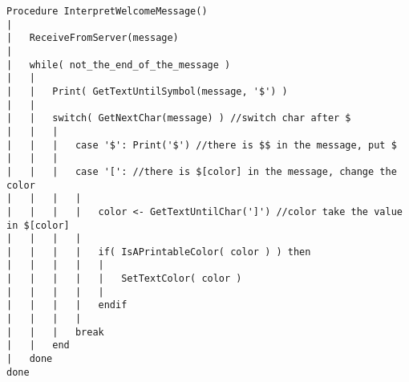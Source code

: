 \begin{lstlisting}
Procedure InterpretWelcomeMessage()
|	
|	ReceiveFromServer(message)
|	
|	while( not_the_end_of_the_message )
|	|	
|	|	Print( GetTextUntilSymbol(message, '$') )
|	|	
|	|	switch( GetNextChar(message) ) //switch char after $
|	|	|	
|	|	|	case '$': Print('$') //there is $$ in the message, put $
|	|	|	
|	|	|	case '[': //there is $[color] in the message, change the color
|	|	|	|	
|	|	|	|	color <- GetTextUntilChar(']') //color take the value in $[color]
|	|	|	|	
|	|	|	|	if( IsAPrintableColor( color ) ) then
|	|	|	|	|
|	|	|	|	|	SetTextColor( color )
|	|	|	|	|
|	|	|	|	endif
|	|	|	|	
|	|	|	break
|	|	end
|	done
done
\end{lstlisting}
